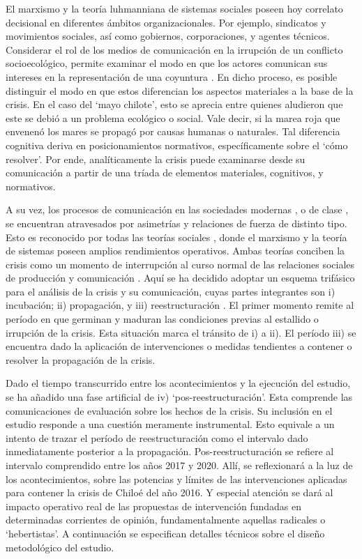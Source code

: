 \documentclass{textolivre}
\begin{document}
El marxismo y la teoría luhmanniana de sistemas sociales poseen hoy correlato
decisional en diferentes ámbitos organizacionales. Por ejemplo, sindicatos y movimientos
sociales, así como gobiernos, corporaciones, y agentes técnicos. Considerar el rol de los
medios de comunicación en la irrupción de un conflicto socioecológico, permite examinar
el modo en que los actores comunican sus intereses en la representación de una
coyuntura \cite{Gunderson2019,Habermas2006}. En dicho
proceso, es posible distinguir el modo en que estos diferencian los aspectos materiales a
la base de la crisis. En el caso del ‘mayo chilote’, esto se aprecia entre quienes aludieron
que este se debió a un problema ecológico o social. Vale decir, si la marea roja que
envenenó los mares se propagó por causas humanas o naturales. Tal diferencia cognitiva
deriva en posicionamientos normativos, específicamente sobre el ‘cómo resolver’. Por
ende, analíticamente la crisis puede examinarse desde su comunicación a partir de una
tríada de elementos materiales, cognitivos, y normativos.

A su vez, los procesos de comunicación en las sociedades modernas \cite{Tkke2010},
o de clase \cite{lenin1997,marx2003}, se encuentran atravesados por
asimetrías y relaciones de fuerza de distinto tipo. Esto es reconocido por todas las teorías
sociales \cite{Habermas2006,Luhmann2007,teubner2012}, donde el marxismo y
la teoría de sistemas poseen amplios rendimientos operativos. Ambas teorías conciben la
crisis como un momento de interrupción al curso normal de las relaciones sociales de
producción y comunicación \cite{Luhmann1984,marx2010}. Aquí se ha decidido adoptar
un esquema trifásico para el análisis de la crisis y su comunicación, cuyas partes
integrantes son i) incubación; ii) propagación, y iii) reestructuración \cite{Mascareo2018b}. 
El primer momento remite al período en que germinan y maduran las condiciones
previas al estallido o irrupción de la crisis. Esta situación marca el tránsito de i) a ii). El
período iii) se encuentra dado la aplicación de intervenciones o medidas tendientes a
contener o resolver la propagación de la crisis.

Dado el tiempo transcurrido entre los acontecimientos y la ejecución del estudio, se
ha añadido una fase artificial de iv) ‘pos-reestructuración’. Esta comprende las
comunicaciones de evaluación sobre los hechos de la crisis. Su inclusión en el estudio
responde a una cuestión meramente instrumental. Esto equivale a un intento de trazar el
período de reestructuración como el intervalo dado inmediatamente posterior a la
propagación. Pos-reestructuración se refiere al intervalo comprendido entre los años 2017
y 2020. Allí, se reflexionará a la luz de los acontecimientos, sobre las potencias y límites
de las intervenciones aplicadas para contener la crisis de Chiloé del año 2016. Y especial
atención se dará al impacto operativo real de las propuestas de intervención fundadas en
determinadas corrientes de opinión, fundamentalmente aquellas radicales o ‘hebertistas’.
A continuación se especifican detalles técnicos sobre el diseño metodológico del estudio.
\end{document}
